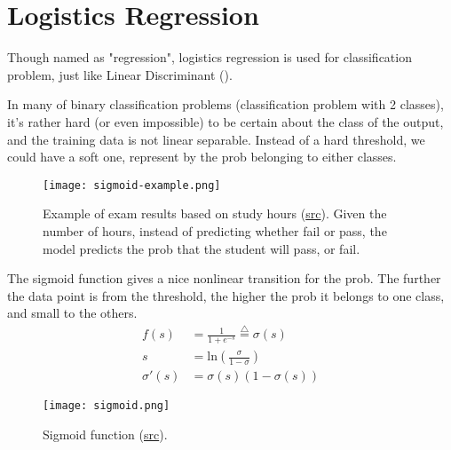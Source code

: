 \section{Logistics Regression}

Though named as "regression", logistics regression is used for classification problem, just like Linear Discriminant ().

 In many of binary classification problems (classification problem with 2 classes), it's rather hard (or even impossible) to be certain about the class of the output, and the training data is not linear separable. Instead of a hard threshold, we could have a soft one, represent by the \ac{prob} belonging to either classes.
\begin{figure}[hbt!]
	\centering
	\texttt{[image: sigmoid-example.png]}
	\caption{Example of exam results based on study hours (\href{https://machinelearningcoban.com/2017/01/27/logisticregression/}{src}). Given the number of hours, instead of predicting whether fail or pass, the model predicts the \ac{prob} that the student will pass, or fail.}
\end{figure}

The sigmoid function gives a nice nonlinear transition for the \ac{prob}. The further the data point is from the threshold, the higher the \ac{prob} it belongs to one class, and small to the others.
\begin{align}
	f(s) 		&= \frac{1}{1 + e^{-s}} \overset{\triangle}{=} \sigma(s) \\
	s 			&= \text{ln} \left( \frac{\sigma}{1-\sigma} \right) \\
	\sigma'(s)	&= \sigma(s) \left( 1- \sigma(s) \right)
	\label{eq:sigmoid}
\end{align}
\begin{figure}[hbt!]
	\centering
	\texttt{[image: sigmoid.png]}
	\caption{Sigmoid function (\href{https://en.wikipedia.org/wiki/Sigmoid_function}{src}).}
\end{figure}

